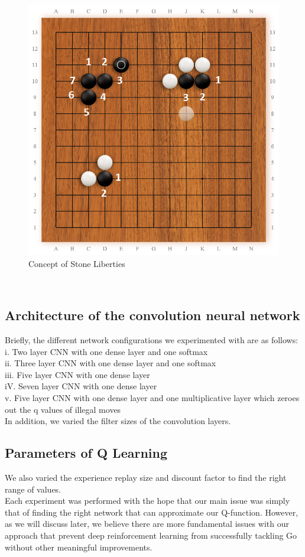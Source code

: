 \begin{figure}[h]
	\centering
	\includegraphics[scale=0.25]{ExampleLiberties}
	\caption{Concept of Stone Liberties}
\label{fig:liberties}
\end{figure}
\\
\subsection{Architecture of the convolution neural network}
Briefly, the different network configurations we experimented with are as follows:
\\
i. Two layer CNN with one dense layer and one softmax
\\
ii. Three layer CNN with one dense layer and one softmax
\\
iii. Five layer CNN with one dense layer
\\
iV. Seven layer CNN with one dense layer
\\
v. Five layer CNN with one dense layer and one multiplicative layer which zeroes out the q values of illegal moves
\\
In addition, we varied the filter sizes of the convolution layers.
\subsection{Parameters of Q Learning}
We also varied the experience replay size and discount factor to find the right range of values. 
\\
Each experiment was performed with the hope that our main issue was simply that of finding the right network that can approximate our Q-function. However, as we will discuss later, we believe there are more fundamental issues with our approach that prevent deep reinforcement learning from successfully tackling Go without other meaningful improvements.
